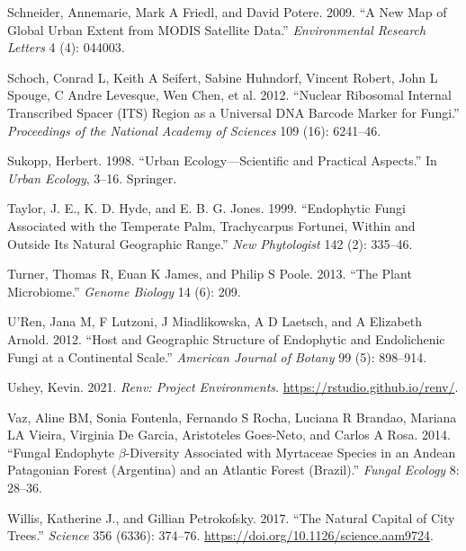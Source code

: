 \documentclass[fleqn,10pt,lineno]{wlpeerj} %
\newlength{\cslhangindent}
\newenvironment{CSLReferences}[2] %
 {%
  \setlength{\parindent}{0pt}
  \ifodd #1 \everypar{\setlength{\hangindent}{\cslhangindent}}\ignorespaces\fi
  \ifnum #2 > 0
  \setlength{\parskip}{#2\baselineskip}
  \fi
 }%
 {}
\begin{document}
\begin{CSLReferences}{1}{0}
\leavevmode{}%
Schneider, Annemarie, Mark A Friedl, and David Potere. 2009. {``A New Map of Global Urban Extent from MODIS Satellite Data.''} \emph{Environmental Research Letters} 4 (4): 044003.

\leavevmode{}%
Schoch, Conrad L, Keith A Seifert, Sabine Huhndorf, Vincent Robert, John L Spouge, C Andre Levesque, Wen Chen, et al. 2012. {``Nuclear Ribosomal Internal Transcribed Spacer (ITS) Region as a Universal DNA Barcode Marker for Fungi.''} \emph{Proceedings of the National Academy of Sciences} 109 (16): 6241--46.

\leavevmode{}%
Sukopp, Herbert. 1998. {``Urban Ecology---Scientific and Practical Aspects.''} In \emph{Urban Ecology}, 3--16. Springer.

\leavevmode{}%
Taylor, J. E., K. D. Hyde, and E. B. G. Jones. 1999. {``Endophytic Fungi Associated with the Temperate Palm, Trachycarpus Fortunei, Within and Outside Its Natural Geographic Range.''} \emph{New Phytologist} 142 (2): 335--46.

\leavevmode{}%
Turner, Thomas R, Euan K James, and Philip S Poole. 2013. {``The Plant Microbiome.''} \emph{Genome Biology} 14 (6): 209.

\leavevmode{}%
U'Ren, Jana M, F Lutzoni, J Miadlikowska, A D Laetsch, and A Elizabeth Arnold. 2012. {``Host and Geographic Structure of Endophytic and Endolichenic Fungi at a Continental Scale.''} \emph{American Journal of Botany} 99 (5): 898--914.

\leavevmode{}%
Ushey, Kevin. 2021. \emph{Renv: Project Environments}. \url{https://rstudio.github.io/renv/}.

\leavevmode{}%
Vaz, Aline BM, Sonia Fontenla, Fernando S Rocha, Luciana R Brandao, Mariana LA Vieira, Virginia De Garcia, Aristoteles Goes-Neto, and Carlos A Rosa. 2014. {``Fungal Endophyte \(\beta\)-Diversity Associated with Myrtaceae Species in an Andean Patagonian Forest (Argentina) and an Atlantic Forest (Brazil).''} \emph{Fungal Ecology} 8: 28--36.

\leavevmode{}%
Willis, Katherine J., and Gillian Petrokofsky. 2017. {``The Natural Capital of City Trees.''} \emph{Science} 356 (6336): 374--76. \url{https://doi.org/10.1126/science.aam9724}.


\end{CSLReferences}
\end{document}
